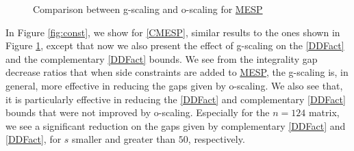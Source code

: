\documentclass[smallextended]{svjour3hack}       %
\begin{document}
{\begin{figure}
        \caption[ ]
        {\small Comparison between g-scaling and o-scaling for \hyperlink{MESP}{MESP}}
        \label{fig:unconst}
    \end{figure}





In Figure \ref{fig:const}, we show for \ref{CMESP}, similar results  to the ones shown in Figure \ref{fig:unconst}, except that now we also present the effect of g-scaling on  the \ref{DDFact} and the complementary \ref{DDFact} bounds. We see from the integrality gap decrease ratios that when side constraints are added to  \hyperlink{MESP}{MESP}, the g-scaling is, in general, more effective in reducing the gaps given by o-scaling. We also see that,   it is particularly  effective in reducing the \ref{DDFact} and complementary \ref{DDFact} bounds that were not improved by o-scaling. Especially for the $n=124$ matrix, we see a significant reduction on the gaps given by complementary \ref{DDFact} and \ref{DDFact}, for $s$ smaller and greater than  $50$, respectively.

}
\end{document}
